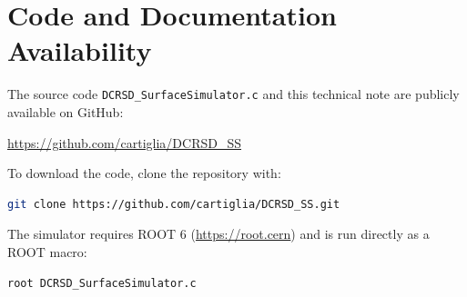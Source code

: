 \documentclass[preprint,numbers,1p]{elsarticle}
\begin{document}
\section*{Code and Documentation Availability}
\label{sec:availability}

The source code \texttt{DCRSD\_SurfaceSimulator.c} and this technical note are publicly
available on GitHub:
\begin{center}
  \url{https://github.com/cartiglia/DCRSD_SS}
\end{center}
To download the code, clone the repository with:
\begin{lstlisting}[language=bash]
git clone https://github.com/cartiglia/DCRSD_SS.git
\end{lstlisting}
The simulator requires ROOT 6 (\url{https://root.cern}) and is run directly as a ROOT macro:
\begin{lstlisting}[language=bash]
root DCRSD_SurfaceSimulator.c
\end{lstlisting}
\end{document}
